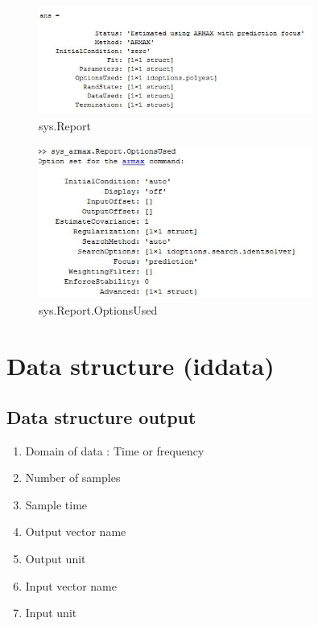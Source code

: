 \documentclass[a4paper,12pt]{report}
\begin{document}
	
	
	\begin{figure}[tbp]
		\centering
		\includegraphics[width=0.8\textwidth]{repMat.JPG}
		\caption{sys.Report}
		\label{}
	\end{figure}
	
				
			\begin{figure}[tbp]
				\centering
				\includegraphics[width=0.8\textwidth]{OptMat.JPG}
				\caption{sys.Report.OptionsUsed}
				\label{}
			\end{figure}
			\chapter{Data structure (iddata)}
			\section{Data structure output}
		
			 
			\begin{enumerate}
				\item Domain of data : Time or frequency
				\item Number of samples
			\item Sample time
			\item Output vector name
			\item Output unit 
			\item Input vector name
		\item Input unit
			
		\end{enumerate}
\end{document}

